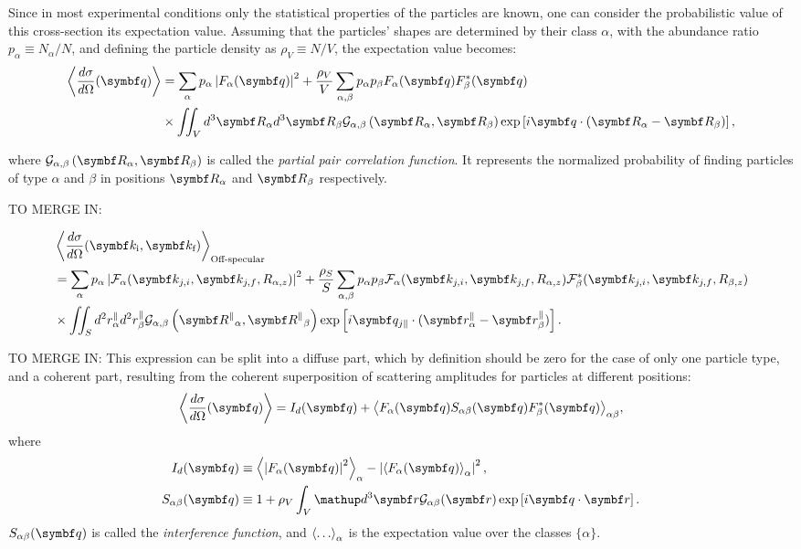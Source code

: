 Since in most experimental conditions only the statistical properties of the particles are known, one can consider the probabilistic value of this cross-section \idest its expectation value. Assuming that the particles' shapes are determined by their class $\alpha$, with the abundance ratio $p_\alpha \equiv N_\alpha / N$, and defining the particle density as $\rho_V \equiv N/V$, the expectation value becomes:
\begin{align*}
  \bra \frac{d\sigma}{d\Omega}(\q) \ket  & = \sum_\alpha p_\alpha \left\lvert F_\alpha(\q)\right\rvert ^2 + \frac{\rho_V}{V}\sum_{\alpha,\beta} p_\alpha p_\beta F_\alpha (\q)F_\beta^*(\q)  \\
  & \times \iint_V d^3\v{R}_\alpha d^3\v{R}_\beta \ppcf{\alpha}{\beta}{R} \exp \left[ i\q\cdot (\v{R}_\alpha - \v{R}_\beta ) \right],
\end{align*}


where $\ppcf{\alpha}{\beta}{R}$ is called the \emph{partial pair correlation function}. It represents the normalized probability of finding particles of type $\alpha$ and $\beta$ in positions $\v{R}_\alpha$ and $\v{R}_\beta$ respectively.

TO MERGE IN:

\begin{align*}
  & \bra \frac{d\sigma}{d\Omega}(\k_\ti,\k_\tf) \ket_{\text{Off-specular}}  \\
  & = \sum_\alpha p_\alpha \left\lvert \curlf_\alpha(\k_{j,i},\k_{j,f}, R_{\alpha,z})\right\rvert ^2 + \frac{\rho_S}{S}\sum_{\alpha,\beta} p_\alpha p_\beta \curlf_\alpha (\k_{j,i},\k_{j,f}, R_{\alpha,z})\curlf_\beta^*(\k_{j,i},\k_{j,f}, R_{\beta,z}) \\
  & \times \iint_S d^2r_\alpha^\plll d^2r_\beta^\plll \ppcf{\alpha}{\beta}{R^\plll} \exp \left[ i\v{q}_{j\plll}\cdot (\r_\alpha^\plll - \r_\beta^\plll ) \right].
\end{align*}


TO MERGE IN:
This expression can be split into a diffuse part, which by definition should be zero for the case of only one particle type, and a coherent part, resulting from the coherent superposition of scattering amplitudes for particles at different positions:
\begin{equation*}
  \bra \frac{d\sigma}{d\Omega}(\q) \ket
  = I_d(\q) + {\bra F_\alpha (\q ) S_{\alpha\beta} (\q) F_\beta^* (\q)
               \ket}_{\alpha\beta},
\end{equation*}
where
\begin{align*}
  I_d(\q) &
  \equiv {\bra\left\rvert F_\alpha (\q) \right\rvert^2\ket}_{\alpha}
       - \left\lvert {\bra F_\alpha (\q)\ket}_{\alpha} \right\rvert^2, \\
  S_{\alpha\beta} (\q) &\equiv 1 + \rho_V \int_V \d^3\r\mathcal{G}_{\alpha\beta}(\r)
                       \exp \left[ i\q\cdot \r \right].
\end{align*}
$S_{\alpha\beta} (\q)$ is called the \emph{interference function},
and $\bra\dotso\ket_\alpha$ is the expectation value over the classes $\lbrace \alpha\rbrace$.


